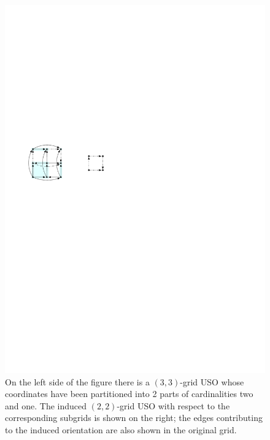 \documentclass[runningheads,a4paper]{llncs}
\begin{document}
  \begin{figure}[htbp] 
  	\centering
  	\includegraphics[scale=1]{induced_orientation_ex.pdf}
  	\caption{\small On the left side of the figure there is a $(3,3)$-grid USO whose %
  	coordinates have been partitioned into 2 parts of cardinalities two and one. The induced $(2,2)$-grid USO with respect to the corresponding subgrids is shown on the right; the edges contributing to the induced orientation are also shown in the original grid.} 
  	\label{fig:example_induced_orientation}
  \end{figure}
\end{document}
